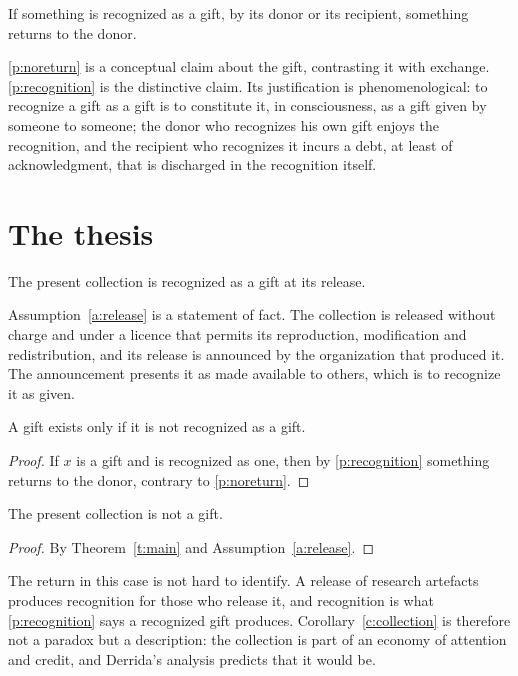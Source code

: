 \documentclass{situationist-preprint}
\begin{document}
\begin{principle}\label{p:recognition}
If something is recognized as a gift, by its donor or its recipient, something returns to the donor.
\end{principle}

\ref{p:noreturn} is a conceptual claim about the gift, contrasting it with exchange. \ref{p:recognition} is the distinctive claim. Its justification is phenomenological: to recognize a gift as a gift is to constitute it, in consciousness, as a gift given by someone to someone; the donor who recognizes his own gift enjoys the recognition, and the recipient who recognizes it incurs a debt, at least of acknowledgment, that is discharged in the recognition itself.

\section{The thesis}

\begin{assumption}\label{a:release}
The present collection is recognized as a gift at its release.
\end{assumption}

Assumption~\ref{a:release} is a statement of fact. The collection is released without charge and under a licence that permits its reproduction, modification and redistribution, and its release is announced by the organization that produced it. The announcement presents it as made available to others, which is to recognize it as given.

\begin{theorem}\label{t:main}
A gift exists only if it is not recognized as a gift.
\end{theorem}

\begin{proof}
If $x$ is a gift and is recognized as one, then by \ref{p:recognition} something returns to the donor, contrary to \ref{p:noreturn}.
\end{proof}

\begin{corollary}\label{c:collection}
The present collection is not a gift.
\end{corollary}

\begin{proof}
By Theorem~\ref{t:main} and Assumption~\ref{a:release}.
\end{proof}

The return in this case is not hard to identify. A release of research artefacts produces recognition for those who release it, and recognition is what \ref{p:recognition} says a recognized gift produces. Corollary~\ref{c:collection} is therefore not a paradox but a description: the collection is part of an economy of attention and credit, and Derrida's analysis predicts that it would be.
\end{document}
